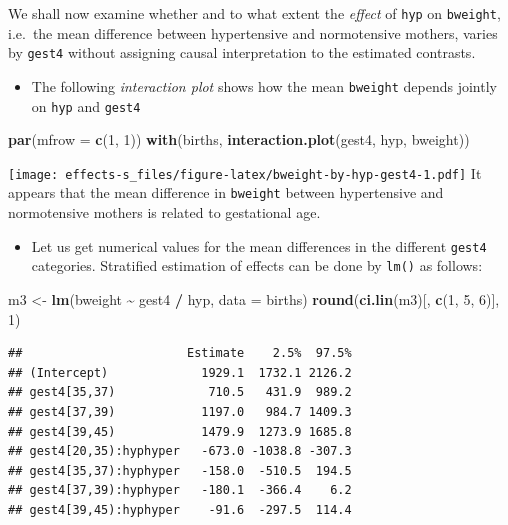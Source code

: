 \documentclass[
]{book}
\newenvironment{Shaded}{\begin{snugshade}}{\end{snugshade}}
\newcommand{\AttributeTok}[1]{\textcolor[rgb]{0.13,0.29,0.53}{#1}}
\newcommand{\DecValTok}[1]{\textcolor[rgb]{0.00,0.00,0.81}{#1}}
\newcommand{\FunctionTok}[1]{\textcolor[rgb]{0.13,0.29,0.53}{\textbf{#1}}}
\newcommand{\NormalTok}[1]{#1}
\newcommand{\OtherTok}[1]{\textcolor[rgb]{0.56,0.35,0.01}{#1}}
\newcommand{\SpecialCharTok}[1]{\textcolor[rgb]{0.81,0.36,0.00}{\textbf{#1}}}
\providecommand{\tightlist}{%
  \setlength{\itemsep}{0pt}\setlength{\parskip}{0pt}}
\begin{document}
We shall now examine whether and to what extent the
\emph{effect} of \texttt{hyp} on \texttt{bweight}, i.e.~the
mean difference between hypertensive and normotensive mothers,
varies by \texttt{gest4} without assigning
causal interpretation to the estimated contrasts.

\begin{itemize}
\tightlist
\item
  The following \emph{interaction plot}
  shows how the mean \texttt{bweight} depends jointly on \texttt{hyp} and \texttt{gest4}
\end{itemize}

\begin{Shaded}
\begin{Highlighting}[]
\FunctionTok{par}\NormalTok{(}\AttributeTok{mfrow =} \FunctionTok{c}\NormalTok{(}\DecValTok{1}\NormalTok{, }\DecValTok{1}\NormalTok{))}
\FunctionTok{with}\NormalTok{(births, }\FunctionTok{interaction.plot}\NormalTok{(gest4, hyp, bweight))}
\end{Highlighting}
\end{Shaded}

\texttt{[image: effects-s\_files/figure-latex/bweight-by-hyp-gest4-1.pdf]}
It appears that the mean difference in \texttt{bweight} between
hypertensive and normotensive
mothers is related to gestational age.

\begin{itemize}
\tightlist
\item
  Let us get numerical values for the mean differences
  in the different \texttt{gest4} categories.
  Stratified estimation of effects can be done by \texttt{lm()} as follows:
\end{itemize}

\begin{Shaded}
\begin{Highlighting}[]
\NormalTok{m3 }\OtherTok{\textless{}{-}} \FunctionTok{lm}\NormalTok{(bweight }\SpecialCharTok{\textasciitilde{}}\NormalTok{ gest4 }\SpecialCharTok{/}\NormalTok{ hyp, }\AttributeTok{data =}\NormalTok{ births)}
\FunctionTok{round}\NormalTok{(}\FunctionTok{ci.lin}\NormalTok{(m3)[, }\FunctionTok{c}\NormalTok{(}\DecValTok{1}\NormalTok{, }\DecValTok{5}\NormalTok{, }\DecValTok{6}\NormalTok{)], }\DecValTok{1}\NormalTok{)}
\end{Highlighting}
\end{Shaded}

\begin{verbatim}
##                       Estimate    2.5%  97.5%
## (Intercept)             1929.1  1732.1 2126.2
## gest4[35,37)             710.5   431.9  989.2
## gest4[37,39)            1197.0   984.7 1409.3
## gest4[39,45)            1479.9  1273.9 1685.8
## gest4[20,35):hyphyper   -673.0 -1038.8 -307.3
## gest4[35,37):hyphyper   -158.0  -510.5  194.5
## gest4[37,39):hyphyper   -180.1  -366.4    6.2
## gest4[39,45):hyphyper    -91.6  -297.5  114.4
\end{verbatim}
\end{document}
